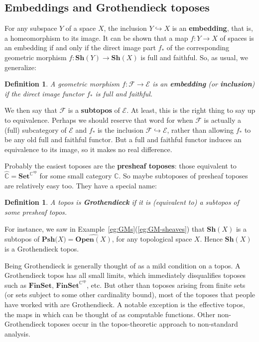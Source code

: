 \documentclass{article}
\newcommand{\cat}[1]{\mathscr{#1}}
\newcommand{\fcat}[1]{\mathbf{#1}}
\newcommand{\op}{\mathrm{op}}
\newcommand{\Set}{\fcat{Set}}
\newcommand{\demph}[1]{\textbf{\textup{#1}}}
\newcommand{\scat}[1]{\mathbb{#1}}
\newcommand{\chunk}[1]{\subsection*{#1}}
\newcommand{\E}{\cat{E}}
\newcommand{\F}{\cat{F}}
\newcommand{\Pshf}[1]{\fcat{Psh}{#1}}
\newcommand{\Psh}[1]{\widehat{#1}}
\newcommand{\Sh}{\fcat{Sh}}
\newcommand{\Open}{\fcat{Open}}
\newcommand{\FinSet}{\fcat{FinSet}}
\newcommand{\incl}{\hookrightarrow}
\newcommand{\cln}{\colon}
\newtheorem{predefn}[thm]{Definition}
\newenvironment{defn}{\begin{predefn}\upshape}{\end{predefn}}
\begin{document}
\chunk{Embeddings and Grothendieck toposes}


For any subspace $Y$ of a space $X$, the inclusion $Y \incl X$ is an
\demph{embedding}, that is, a homeomorphism to its image.  It can be shown
that a map $f\cln Y \to X$ of spaces is an embedding if and only if the direct
image part $f_*$ of the corresponding geometric morphism $f\cln \Sh(Y) \to
\Sh(X)$ is full and faithful.  So, as usual, we generalize:

\begin{defn}
A geometric morphism $f\cln \F \to \E$ is an \demph{embedding} (or
\demph{inclusion}) if the direct image functor $f_*$ is full and faithful.
\end{defn}

We then say that $\F$ is a \demph{subtopos} of $\E$.  At least, this is the
right thing to say up to equivalence.  Perhaps we should reserve that word for
when $\F$ is actually a (full) subcategory of $\E$ and $f_*$ is the inclusion
$\F \incl \E$, rather than allowing $f_*$ to be any old full and faithful
functor.  But a full and faithful functor induces an equivalence to its image,
so it makes no real difference.

Probably the easiest toposes are the \demph{presheaf toposes}: those
equivalent to $\Psh{\scat{C}} = \Set^{\scat{C}^\op}$ for some small category
$\scat{C}$.  So maybe subtoposes of presheaf toposes are relatively easy too.
They have a special name:

\begin{defn}    \label{defn:GT}
A topos is \demph{Grothendieck} if it is (equivalent to) a subtopos of some
presheaf topos.
\end{defn}

For instance, we saw in Example~\ref{eg:GMs}(\ref{eg:GM-sheaves}) that
$\Sh(X)$ is a subtopos of $\Pshf(X) = \Psh{\Open(X)}$, for any topological
space $X$.  Hence $\Sh(X)$ is a Grothendieck topos.

Being Grothendieck is generally thought of as a mild condition on a topos.  A
Grothendieck topos has all small limits, which immediately disqualifies
toposes such as $\FinSet$, $\FinSet^{\scat{C}^\op}$, etc.  But other than
toposes arising from finite sets (or sets subject to some other cardinality
bound), most of the toposes that people have worked with are Grothendieck.  A
notable exception is the effective topos, the maps in which can be thought of
as computable functions.  Other non-Grothendieck toposes occur in the
topos-theoretic approach to non-standard analysis.
\end{document}
